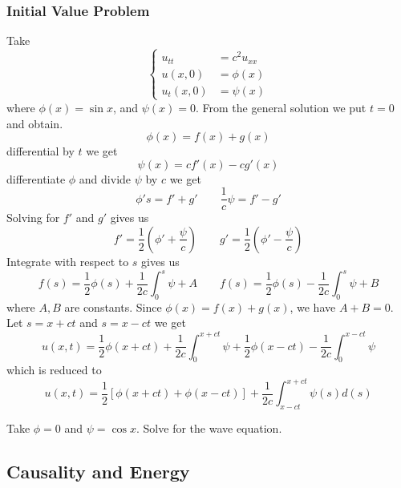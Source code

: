 \subsubsection{Initial Value Problem}
Take 
\[ \left\{ \begin{array}{rl} 
	u_{tt}  &= c^2 u_{xx}   \\
	u(x,0) &= \phi(x) \\
	u_t(x,0) &= \psi(x)
\end{array} \right. \]
where $\phi(x) = \sin x$, and $\psi(x) = 0$.
From the general solution we put $t = 0$ and obtain.
\[ \phi(x) = f(x) + g(x)\]
differential by $t$ we get
\[ \psi(x) = cf'(x) - cg'(x)\]
differentiate $\phi$ and divide $\psi$ by $c$ we get
\[ \phi's = f' + g' \qquad \frac1c \psi = f' - g'\]
Solving for $f'$ and $g'$ gives us
\[ f' = \frac 12 \left( \phi' + \frac \psi c \right) \qquad g' = \frac 12 \left( \phi' - \frac \psi c \right)  \]
Integrate with respect to $s$ gives us
\[ f(s) = \frac 12 \phi(s) + \frac 1{2c} \int_0^s \psi + A \qquad f(s) = \frac 12 \phi(s) - \frac 1{2c} \int_0^s \psi + B\]
where $A,B$ are constants. Since $\phi(x) = f(x) + g(x)$, we have $A + B = 0$. Let $s = x + ct$ and $s = x - ct$ we get
\[u(x, t)=\frac{1}{2} \phi(x+c t)+\frac{1}{2 c} \int_{0}^{x+c t} \psi+\frac{1}{2} \phi(x-c t)-\frac{1}{2 c} \int_{0}^{x-c t} \psi\]
which is reduced to 
\[ \boxed{u(x,t) = \frac12 \left[ \phi(x + ct) + \phi(x - ct) \right] + \frac 1 {2c} \int_{x - ct}^{x + ct} \psi(s) d(s)}\]
\begin{example}
	Take $\phi = 0$ and $\psi = \cos x$. Solve for the wave equation.
\end{example}

\subsection{Causality and Energy}



